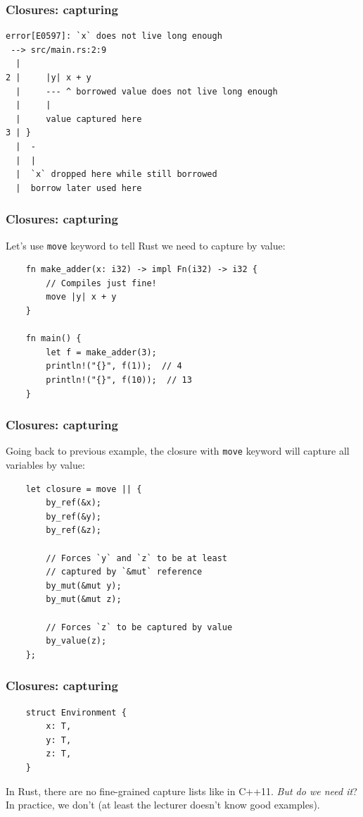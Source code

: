 \documentclass[aspectratio=1610,t]{beamer}
\begin{document}

\begin{frame}[fragile]
\frametitle{Closures: capturing}
\begin{verbatim}
error[E0597]: `x` does not live long enough
 --> src/main.rs:2:9
  |
2 |     |y| x + y
  |     --- ^ borrowed value does not live long enough
  |     |
  |     value captured here
3 | }
  |  -
  |  |
  |  `x` dropped here while still borrowed
  |  borrow later used here
\end{verbatim}
\end{frame}


\begin{frame}[fragile]
\frametitle{Closures: capturing}
Let's use \texttt{move} keyword to tell Rust we need to capture by value:

\begin{verbatim}
    fn make_adder(x: i32) -> impl Fn(i32) -> i32 {
        // Compiles just fine!
        move |y| x + y
    }

    fn main() {
        let f = make_adder(3);
        println!("{}", f(1));  // 4
        println!("{}", f(10));  // 13
    }
\end{verbatim}
\end{frame}


\begin{frame}[fragile]
\frametitle{Closures: capturing}
Going back to previous example, the closure with \texttt{move} keyword will capture all variables by value:

\begin{verbatim}
    let closure = move || {
        by_ref(&x);
        by_ref(&y);
        by_ref(&z);

        // Forces `y` and `z` to be at least
        // captured by `&mut` reference
        by_mut(&mut y);
        by_mut(&mut z);

        // Forces `z` to be captured by value
        by_value(z);
    };
\end{verbatim}
\end{frame}


\begin{frame}[fragile]
\frametitle{Closures: capturing}
\begin{verbatim}
    struct Environment {
        x: T,
        y: T,
        z: T,
    }
\end{verbatim}

In Rust, there are no fine-grained capture lists like in C++11. \textit{But do we need it}? In practice, we don't (at least the lecturer doesn't know good examples).
\end{frame}
\end{document}
